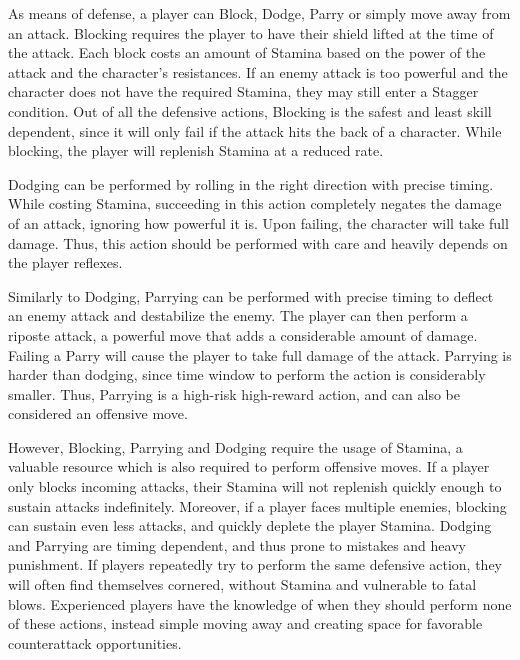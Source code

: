 As means of defense, a player can Block, Dodge, Parry or simply move away from an attack. Blocking requires the player to have their shield lifted at the time of the attack. Each block costs an amount of Stamina based on the power of the attack and the character's resistances. If an enemy attack is too powerful and the character does not have the required Stamina, they may still enter a Stagger condition. Out of all the defensive actions, Blocking is the safest and least skill dependent, since it will only fail if the attack hits the back of a character. While blocking, the player will replenish Stamina at a reduced rate.

Dodging can be performed by rolling in the right direction with precise timing. While costing Stamina, succeeding in this action completely negates the damage of an attack, ignoring how powerful it is. Upon failing, the character will take full damage. Thus, this action should be performed with care and heavily depends on the player reflexes.

Similarly to Dodging, Parrying can be performed with precise timing to deflect an enemy attack and destabilize the enemy. The player can then perform a riposte attack, a powerful move that adds a considerable amount of damage. Failing a Parry will cause the player to take full damage of the attack. Parrying is harder than dodging, since time window to perform the action is considerably smaller. Thus, Parrying is a high-risk high-reward action, and can also be considered an offensive move.

However, Blocking, Parrying and Dodging require the usage of Stamina, a valuable resource which is also required to perform offensive moves. If a player only blocks incoming attacks, their Stamina will not replenish quickly enough to sustain attacks indefinitely. Moreover, if a player faces multiple enemies, blocking can sustain even less attacks, and quickly deplete the player Stamina. Dodging and Parrying are timing dependent, and thus prone to mistakes and heavy punishment. If players repeatedly try to perform the same defensive action, they will often find themselves cornered, without Stamina and vulnerable to fatal blows. Experienced players have the knowledge of when they should perform none of these actions, instead simple moving away and creating space for favorable counterattack opportunities.


